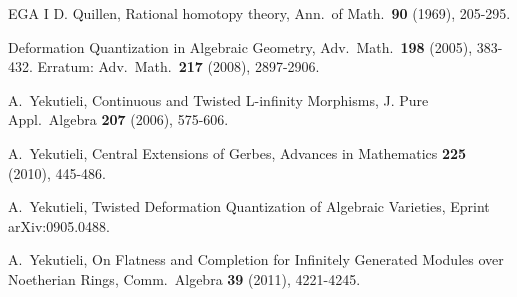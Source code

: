 \documentclass[a4paper,10pt]{amsart}
\theoremstyle{definition}
\numberwithin{equation}{section}
\begin{document}
\begin{thebibliography}{EGA I}
 D. Quillen, Rational homotopy theory, 
Ann.\  of Math.\ {\bf 90} (1969), 205-295.

  Deformation Quantization in Algebraic Geometry,
Adv.\ Math.\ {\bf 198} (2005), 383-432.
Erratum: Adv.\ Math.\ {\bf 217} (2008), 2897-2906.

 A.\ Yekutieli,  
    Continuous and Twisted L-infinity Morphisms,
    J. Pure Appl.\ Algebra {\bf 207} (2006), 575-606.

 A.\ Yekutieli,
Central Extensions of Gerbes,
Advances in Mathematics {\bf 225} (2010), 445-486.

 A.\ Yekutieli, 
Twisted Deformation Quantization of Algebraic Varieties,
Eprint arXiv:0905.0488.

 A.\ Yekutieli,
On Flatness and Completion for Infinitely Generated Modules over Noetherian 
Rings, Comm.\ Algebra {\bf 39} (2011), 4221-4245.

\end{thebibliography}
\end{document}
